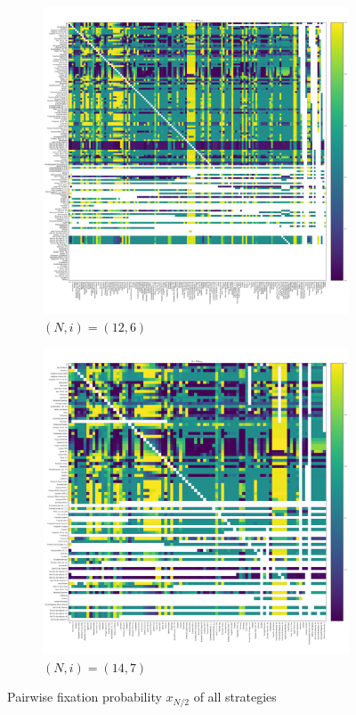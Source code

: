 \documentclass{article}
\begin{document}
\begin{figure}[!hbtp]
\begin{subfigure}[t]{.3\textwidth}
        \centering
        \includegraphics[width=.8\textwidth]{../img/fixation_heatmap_12_coexist.pdf}
        \caption{\((N,i)=(12, 6)\)}
    \end{subfigure}%

    \begin{subfigure}[t]{.3\textwidth}
        \centering
        \includegraphics[width=.8\textwidth]{../img/fixation_heatmap_14_coexist.pdf}
        \caption{\((N,i)=(14, 7)\)}
    \end{subfigure}%
    \caption{Pairwise fixation probability \(x_{N/2}\) of all strategies}
    \label{fig:fixation_heatmap_coexist}
\end{figure}
\end{document}
